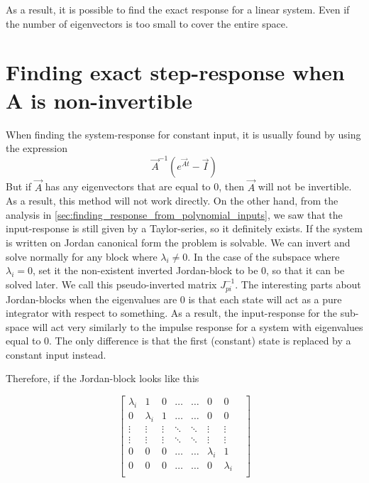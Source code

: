 As a result, it is possible to find the exact response for a linear system. Even if the number of eigenvectors is too small to cover the entire space. 



\section{Finding exact step-response when A is non-invertible}
\label{sec:solving_for_uninvertible_matrices}
When finding the system-response for constant input, it is usually found by using the expression
\begin{equation}
    \Vec{A}^{-1} \left( e^{\Vec{A}t} - \Vec{I}\right)
\end{equation}
But if $\Vec{A}$ has any eigenvectors that are equal to 0, then $\Vec{A}$ will not be invertible. As a result, this method will not work directly. On the other hand, from the analysis in \cref{sec:finding_response_from_polynomial_inputs}, we saw that the input-response is still given by a Taylor-series, so it definitely exists. 
If the system is written on Jordan canonical form the problem is solvable. We can invert  and solve normally for any block where $\lambda_i \neq 0$. In the case of the subspace where $\lambda_i =0$, set it the non-existent inverted Jordan-block to be 0, so that it can be solved later. We call this pseudo-inverted matrix $J^{-1}_{pi}$.
The interesting parts about Jordan-blocks when the eigenvalues are 0 is that each state will act as a pure integrator with respect to something. As a result, the input-response for the sub-space will act very similarly to the impulse response for a system with eigenvalues equal to 0. The only difference is that the first (constant) state is replaced by a constant input instead. 

Therefore, if the Jordan-block looks like this 

\begin{equation}
    \begin{bmatrix}{}
    \lambda_i & 1 & 0 &\dots &\dots & 0 & 0  \\
    0 & \lambda_i & 1 & \dots &\dots & 0 & 0 \\
    \vdots & \vdots & \vdots & \ddots & \ddots & \vdots & \vdots &\\
    \vdots & \vdots & \vdots & \ddots & \ddots & \vdots & \vdots &\\
    0 & 0 & 0 & \dots  & \dots & \lambda_i & 1 \\ 
    0 & 0 & 0  & \dots & \dots & 0 & \lambda_i \\
    \end{bmatrix}
\end{equation}{}

